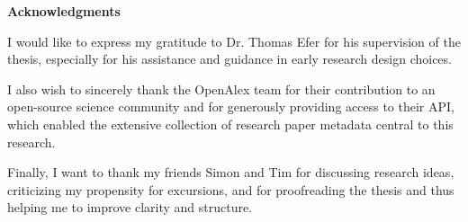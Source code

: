 \documentclass{article}
\begin{document}
	\vspace*{5cm}
	
	\begin{center}
		\LARGE\textbf{Acknowledgments}
	\end{center}
	
	\vspace{3cm}
	
	\begingroup
	\leftskip=1cm
	\rightskip=1cm
	\parindent=0pt
	
	\noindent
	I would like to express my gratitude to Dr. Thomas Efer for his supervision of the thesis, especially for his assistance and guidance in early research design choices.
	
	\vspace{1cm}
	
	\noindent
	I also wish to sincerely thank the OpenAlex team for their contribution to an open-source science community and for generously providing access to their API, which enabled the extensive collection of research paper metadata central to this research.
	
	\vspace{1cm}
	
	\noindent
	Finally, I want to thank my friends Simon and Tim for discussing research ideas, criticizing my propensity for excursions, and for proofreading the thesis and thus helping me to improve clarity and structure.
	
	\par
	\endgroup
	
	\vspace{3cm}
	
	
	
	\vfill
	
	
	\newpage
	
	\vspace*{4cm}
	
\end{document}

